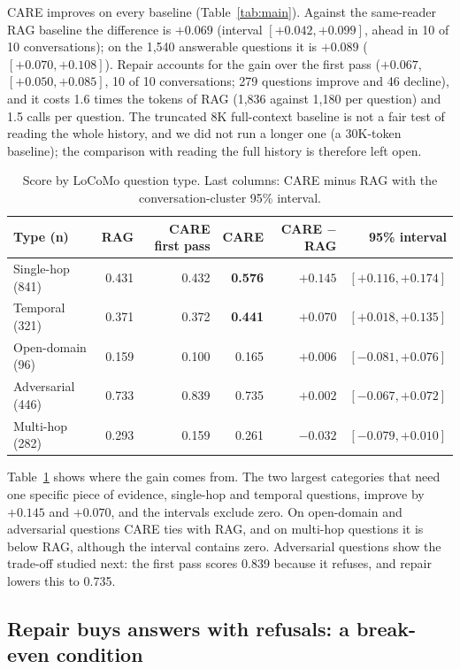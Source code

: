 \documentclass[10pt]{article}
\theoremstyle{plain}
\newcommand{\care}{\textsc{CARE}}
\begin{document}
\care{} improves on every baseline (Table~\ref{tab:main}). Against the same-reader RAG baseline the difference is
$+0.069$ (interval $[+0.042,+0.099]$, ahead in 10 of 10 conversations); on the 1,540 answerable questions it is
$+0.089$ ($[+0.070,+0.108]$). Repair accounts for the gain over the first pass ($+0.067$, $[+0.050,+0.085]$, 10 of 10
conversations; 279 questions improve and 46 decline), and it costs 1.6 times the tokens of RAG (1,836 against 1,180
per question) and 1.5 calls per question. The truncated 8K full-context baseline is not a fair test of reading the
whole history, and we did not run a longer one (a 30K-token baseline); the comparison with reading the full history
is therefore left open.

\begin{table}[t]
\centering
\caption{Score by LoCoMo question type. Last columns: \care{} minus RAG with the conversation-cluster 95\% interval.}
\label{tab:category}
\small
\begin{tabular}{lrrrrr}
\toprule
Type (n) & RAG & \care{} first pass & \care{} & \care{} $-$ RAG & 95\% interval \\
\midrule
Single-hop (841) & 0.431 & 0.432 & \textbf{0.576} & $+0.145$ & $[+0.116,+0.174]$ \\
Temporal (321) & 0.371 & 0.372 & \textbf{0.441} & $+0.070$ & $[+0.018,+0.135]$ \\
Open-domain (96) & 0.159 & 0.100 & 0.165 & $+0.006$ & $[-0.081,+0.076]$ \\
Adversarial (446) & 0.733 & 0.839 & 0.735 & $+0.002$ & $[-0.067,+0.072]$ \\
Multi-hop (282) & 0.293 & 0.159 & 0.261 & $-0.032$ & $[-0.079,+0.010]$ \\
\bottomrule
\end{tabular}
\end{table}

Table~\ref{tab:category} shows where the gain comes from. The two largest categories that need one specific piece of
evidence, single-hop and temporal questions, improve by $+0.145$ and $+0.070$, and the intervals exclude zero. On
open-domain and adversarial questions \care{} ties with RAG, and on multi-hop questions it is below RAG, although the
interval contains zero. Adversarial questions show the trade-off studied next: the first pass scores 0.839 because it
refuses, and repair lowers this to 0.735.

\subsection{Repair buys answers with refusals: a break-even condition}
\label{sec:abstention}
\end{document}
